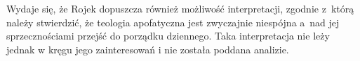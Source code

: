 Wydaje się, że Rojek dopuszcza również możliwość interpretacji, zgodnie z~którą należy stwierdzić, że teologia apofatyczna jest
zwyczajnie niespójna a~nad jej sprzecznościami przejść do porządku dziennego. Taka interpretacja nie leży jednak w kręgu jego  zainteresowań i nie została poddana analizie.



%
%
%
%

